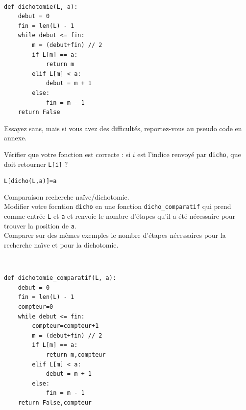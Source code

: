 \begin{solution}~\\
\vspace{-0.7cm}
\begin{verbatim}
def dichotomie(L, a):
    debut = 0
    fin = len(L) - 1
    while debut <= fin:
        m = (debut+fin) // 2
        if L[m] == a:
            return m
        elif L[m] < a:
            debut = m + 1
        else:
            fin = m - 1
    return False
\end{verbatim}
\end{solution}

\begin{remark}
Essayez sans, mais si vous avez des difficultés, reportez-vous au pseudo code en annexe.
\end{remark}


\begin{exercice}
Vérifier que votre fonction est correcte : si $i$ est l'indice renvoyé par \verb?dicho?, que doit retourner \verb?L[i]? ?
\end{exercice}

\begin{solution}
\verb?L[dicho(L,a)]=a?
\end{solution}



\begin{exercice}Comparaison recherche naïve/dichotomie.\\
Modifier votre focntion \verb?dicho? en une fonction \verb?dicho_comparatif? qui prend comme entrée \verb?L? et \verb?a? et renvoie le nombre d'étapes qu'il a été nécessaire pour trouver la position de \verb?a?. \\
Comparer sur des mêmes exemples le nombre d'étapes nécessaires pour la recherche naïve et pour la dichotomie.
\end{exercice}

\begin{solution}~\\
\vspace{-0.7cm}
\begin{verbatim}
def dichotomie_comparatif(L, a):
    debut = 0
    fin = len(L) - 1
    compteur=0
    while debut <= fin:
        compteur=compteur+1
        m = (debut+fin) // 2
        if L[m] == a:
            return m,compteur
        elif L[m] < a:
            debut = m + 1
        else:
            fin = m - 1
    return False,compteur
\end{verbatim}
\end{solution}



